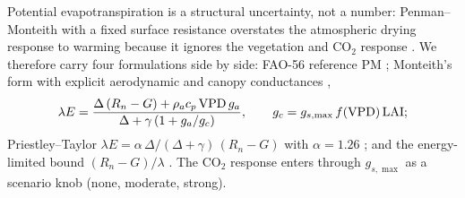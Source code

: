 Potential evapotranspiration is a structural uncertainty, not a number: Penman--Monteith with a fixed surface resistance overstates the atmospheric drying response to warming because it ignores the vegetation and CO$_2$ response \citep{Milly2016,Yang2019}. We therefore carry four formulations side by side: FAO-56 reference PM \citep{Allen1998}; Monteith's form with explicit aerodynamic and canopy conductances \citep{Monteith1965},
\begin{equation}\label{eq:pm}
\lambda E=\frac{\Delta\,(R_n-G)+\rho_a c_p\,\mathrm{VPD}\,g_a}{\Delta+\gamma\,(1+g_a/g_c)},\qquad g_c=g_{s,\max}\,f(\mathrm{VPD})\,\mathrm{LAI};
\end{equation}
Priestley--Taylor $\lambda E=\alpha\,\Delta/(\Delta+\gamma)\,(R_n-G)$ with $\alpha=1.26$ \citep{Priestley1972}; and the energy-limited bound $(R_n-G)/\lambda$ \citep{Milly2016}. The CO$_2$ response enters through $g_{s,\max}$ as a scenario knob (none, moderate, strong).

